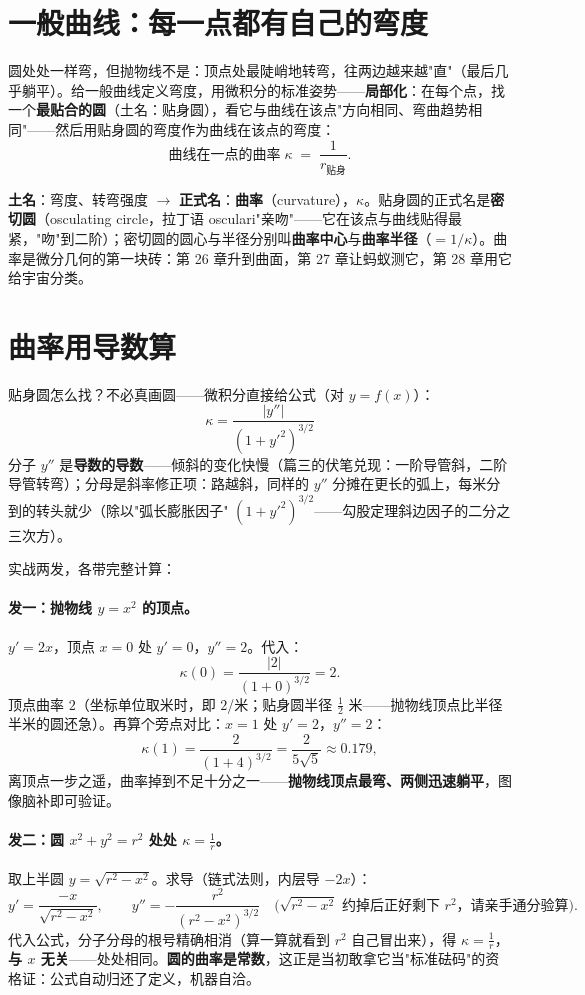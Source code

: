 \section{一般曲线：每一点都有自己的弯度}

圆处处一样弯，但抛物线不是：顶点处最陡峭地转弯，往两边越来越"直"（最后几乎躺平）。给一般曲线定义弯度，用微积分的标准姿势——\textbf{局部化}：在每个点，找一个\textbf{最贴合的圆}（土名：贴身圆），看它与曲线在该点"方向相同、弯曲趋势相同"——然后用贴身圆的弯度作为曲线在该点的弯度：
\[
\text{曲线在一点的曲率} \;\kappa\; =\; \frac{1}{r_{\text{贴身}}} .
\]

\begin{faming}
\textbf{土名}：弯度、转弯强度 $\to$ \textbf{正式名}：\textbf{曲率}（curvature），$\kappa$。贴身圆的正式名是\textbf{密切圆}（osculating circle，拉丁语 osculari"亲吻"——它在该点与曲线贴得最紧，"吻"到二阶）；密切圆的圆心与半径分别叫\textbf{曲率中心}与\textbf{曲率半径}（$= 1/\kappa$）。曲率是微分几何的第一块砖：第 26 章升到曲面，第 27 章让蚂蚁测它，第 28 章用它给宇宙分类。
\end{faming}

\section{曲率用导数算}

贴身圆怎么找？不必真画圆——微积分直接给公式（对 $y = f(x)$）：
\[
\boxed{\;\kappa = \frac{|y''|}{\left(1 + y'^2\right)^{3/2}}\;}
\]
分子 $y''$ 是\textbf{导数的导数}——倾斜的变化快慢（篇三的伏笔兑现：一阶导管斜，二阶导管转弯）；分母是斜率修正项：路越斜，同样的 $y''$ 分摊在更长的弧上，每米分到的转头就少（除以"弧长膨胀因子" $(1+y'^2)^{3/2}$——勾股定理斜边因子的二分之三次方）。

实战两发，各带完整计算：

\paragraph{发一：抛物线 $y = x^2$ 的顶点。}$y' = 2x$，顶点 $x = 0$ 处 $y' = 0$，$y'' = 2$。代入：
\[
\kappa(0) = \frac{|2|}{(1+0)^{3/2}} = 2 .
\]
顶点曲率 $2$（坐标单位取米时，即 $2$/米；贴身圆半径 $\tfrac12$ 米——抛物线顶点比半径半米的圆还急）。再算个旁点对比：$x = 1$ 处 $y' = 2$，$y'' = 2$：
\[
\kappa(1) = \frac{2}{(1+4)^{3/2}} = \frac{2}{5\sqrt5} \approx 0.179 ,
\]
离顶点一步之遥，曲率掉到不足十分之一——\textbf{抛物线顶点最弯、两侧迅速躺平}，图像脑补即可验证。

\paragraph{发二：圆 $x^2 + y^2 = r^2$ 处处 $\kappa = \tfrac1r$。}取上半圆 $y = \sqrt{r^2 - x^2}$。求导（链式法则，内层导 $-2x$）：
\[
y' = \frac{-x}{\sqrt{r^2-x^2}}, \qquad
y'' = -\frac{r^2}{\left(r^2 - x^2\right)^{3/2}}
\quad\text{(}\sqrt{r^2 - x^2}\text{ 约掉后正好剩下 }r^2\text{，请亲手通分验算)} .
\]
代入公式，分子分母的根号精确相消（算一算就看到 $r^2$ 自己冒出来），得 $\kappa = \tfrac1r$，\textbf{与 $x$ 无关}——处处相同。\textbf{圆的曲率是常数}，这正是当初敢拿它当"标准砝码"的资格证：公式自动归还了定义，机器自洽。

